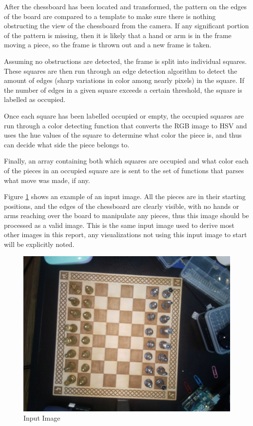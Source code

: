 \documentclass[journal]{IEEEtran}
\begin{document}
After the chessboard has been located and transformed, the pattern on the edges of the board are compared to a template to make sure there is nothing obstructing the view of the chessboard from the camera. If any significant portion of the pattern is missing, then it is likely that a hand or arm is in the frame moving a piece, so the frame is thrown out and a new frame is taken.

Assuming no obstructions are detected, the frame is split into individual squares. These squares are then run through an edge detection algorithm to detect the amount of edges (sharp variations in color among nearly pixels) in the square. If the number of edges in a given square exceeds a certain threshold, the square is labelled as occupied.

Once each square has been labelled occupied or empty, the occupied squares are run through a color detecting function that converts the RGB image to HSV and uses the hue values of the square to determine what color the piece is, and thus can decide what side the piece belongs to.

Finally, an array containing both which squares are occupied and what color each of the pieces in an occupied square are is sent to the set of functions that parses what move was made, if any.

Figure \ref{input} shows an example of an input image. All the pieces are in their starting positions, and the edges of the chessboard are clearly visible, with no hands or arms reaching over the board to manipulate any pieces, thus this image should be processed as a valid image. This is the same input image used to derive most other images in this report, any visualizations not using this input image to start will be explicitly noted.

\begin{figure}[!ht]
	\centering
	\includegraphics[width=\linewidth]{Images/InputImage.jpg}
	\caption{Input Image}
	\label{input}
\end{figure}
\end{document}
